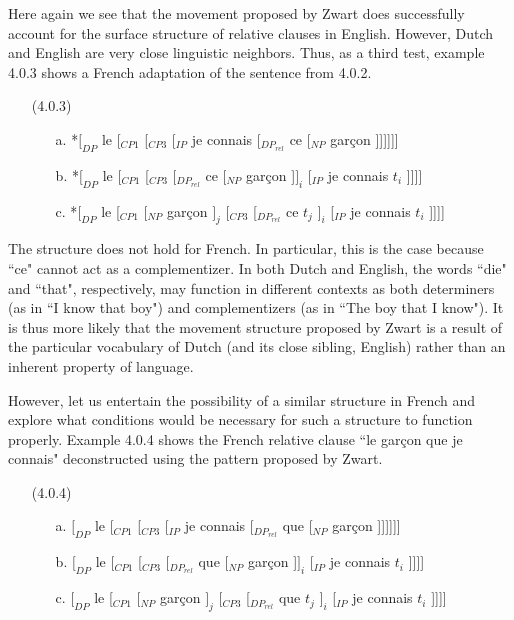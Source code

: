 \documentclass{article}
\begin{document}
Here again we see that the movement proposed by Zwart does successfully account for the surface structure of relative clauses in English. However, Dutch and English are very close linguistic neighbors. Thus, as a third test, example 4.0.3 shows a French adaptation of the sentence from 4.0.2.

\begin{enumerate}
    \item[(4.0.3)] \begin{enumerate}
        \item[a.] *$[_{DP}$ le [$_{CP1}$ [$_{CP3}$ [$_{IP}$ je connais [$_{DP_{rel}}$ ce [$_{NP}$ garçon ]]]]]]
        \item[b.] *$[_{DP}$ le [$_{CP1}$ [$_{CP3}$ [$_{DP_{rel}}$ ce [$_{NP}$ garçon ]$]_i$ [$_{IP}$ je connais $t_i$ ]]]]
        \item[c.] *$[_{DP}$ le [$_{CP1}$ [$_{NP}$ garçon $]_j$ [$_{CP3}$ [$_{DP_{rel}}$ ce $t_j$ $]_i$ [$_{IP}$ je connais $t_i$ ]]]]
    \end{enumerate}
\end{enumerate}

The structure does not hold for French. In particular, this is the case because ``ce" cannot act as a complementizer. In both Dutch and English, the words ``die" and ``that", respectively, may function in different contexts as both determiners (as in ``I know that boy") and complementizers (as in ``The boy that I know"). It is thus more likely that the movement structure proposed by Zwart is a result of the particular vocabulary of Dutch (and its close sibling, English) rather than an inherent property of language.

However, let us entertain the possibility of a similar structure in French and explore what conditions would be necessary for such a structure to function properly. Example 4.0.4 shows the French relative clause ``le garçon que je connais" deconstructed using the pattern proposed by Zwart.

\begin{enumerate}
    \item[(4.0.4)] \begin{enumerate}
        \item[a.] $[_{DP}$ le [$_{CP1}$ [$_{CP3}$ [$_{IP}$ je connais [$_{DP_{rel}}$ que [$_{NP}$ garçon ]]]]]]
        \item[b.] $[_{DP}$ le [$_{CP1}$ [$_{CP3}$ [$_{DP_{rel}}$ que [$_{NP}$ garçon ]$]_i$ [$_{IP}$ je connais $t_i$ ]]]]
        \item[c.] $[_{DP}$ le [$_{CP1}$ [$_{NP}$ garçon $]_j$ [$_{CP3}$ [$_{DP_{rel}}$ que $t_j$ $]_i$ [$_{IP}$ je connais $t_i$ ]]]]
    \end{enumerate}
\end{enumerate}
\end{document}
